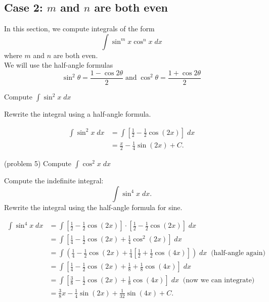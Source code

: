 \documentclass[handout]{ximera}
\begin{document}
\subsection{Case 2: $m$ and $n$ are both even}
In this section, we compute integrals of the form
\[
\int \sin^m x \cos^n x \; dx
\]
where $m$ and $n$ are both even.\\
We will use the half-angle formulas
\[
\sin^2 \theta = \frac{1 - \cos 2\theta}{2} \; \text{and} \; \cos^2 \theta = \frac{1 + \cos 2\theta}{2}
\]

\begin{example}[example 5]
Compute $\displaystyle{\int \sin^2 x \; dx}$

Rewrite the integral using a half-angle formula.

\begin{align*}
\int \sin^2 x \; dx &= \int \left[\frac12- \frac12\cos(2x)\right]  \; dx\\
  &= \frac{x}{2}  - \frac{1}{4}\sin(2x) + C.
\end{align*}
\end{example}

\begin{problem}(problem 5)
Compute $\displaystyle{\int \cos^2 x \; dx}$
\begin{multipleChoice}
\end{multipleChoice}
\end{problem}

\begin{example}[example 6]
Compute the indefinite integral:
\[
\int \sin^4 x \; dx.
\]
Rewrite the integral using the half-angle formula for sine.

\begin{align*}
\int \sin^4 x \; dx &= \int \left[\tfrac12- \tfrac12\cos(2x)\right] \cdot \left[\tfrac12 - \tfrac12\cos(2x)\right] \; dx\\
  &=  \int \left[\tfrac14 - \tfrac12\cos(2x) + \tfrac14\cos^2(2x)\right] \; dx \\
  &= \int \left( \tfrac14 - \tfrac12 \cos(2x) + \tfrac14 
  \left[\tfrac12 + \tfrac12\cos(4x)\right]\right) \; dx  \;\; \text{(half-angle again)} \\
  &= \int \left[\tfrac14 - \tfrac12 \cos(2x) +\tfrac18 + \tfrac18\cos(4x)\right] \; dx\\
  &=  \int \left[\tfrac38 - \tfrac12 \cos(2x) + \tfrac18\cos(4x)\right] \; dx \;\; \text{(now we can integrate)}\\
  &= \tfrac38 x - \tfrac14 \sin(2x) + \tfrac{1}{32}\sin(4x) + C.
\end{align*}
\end{example}
\end{document}
